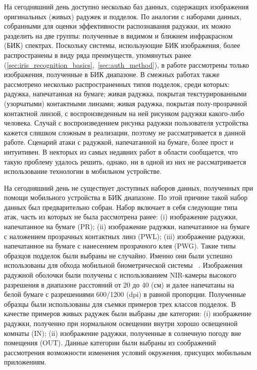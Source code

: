На сегодняшний день доступно несколько баз данных, содержащих изображения оригинальных (живых) радужек и подделок.
По аналогии с наборами данных, собранными для оценки эффективности распознавания радужки, их можно разделить на две группы: полученные в видимом и ближнем инфракрасном (БИК) спектрах. Поскольку системы, использующие БИК изображения, более распространены в виду ряда преимуществ, упомянутых ранее (\ref{sec:iris_recognition_basics},~\ref{sec:auth_method}), в работе рассмотрены только изображения, полученные в БИК диапазоне. В смежных работах также рассмотрено несколько распространенных типов подделок, среди которых: радужка, напечатанная на бумаге; живая радужка, покрытая текстурированными (узорчатыми) контактными линзами; живая радужка, покрытая полу-прозрачной контактной линзой, с воспроизведенным на ней рисунком радужки какого-либо человека. Случай с воспроизведением рисунка радужки пользователя устройства кажется слишком сложным в реализации, поэтому не рассматривается в данной работе. Сценарий атаки с радужкой, напечатанной на бумаге, более прост и интуитивен. В некторых из самых недавних работ в области сообщается, что такую проблему удалось решить, однако, ни в одной из них не рассматривается использование технологии в мобильном устройстве.

На сегодняшний день не существует доступных наборов данных, полученных при помощи мобильного устройства в БИК диапазоне. По этой причине такой набор данных был предварительно собран. Набор включает в себя следующие типа атак, часть из которых не была рассмотрена ранее: (i) изображение радужки, напечатанное на бумаге (PR); (ii) изображение радужки, напечатанное на бумаге с наложением прозрачных контактных линз (PWL); (iii) изображение радужки, напечатанное на бумаге с нанесением прозрачного клея (PWG). Такие типы образцов подделок были выбраны не случайно. Именно они были успешно использованы для обхода мобильной биометрической системы ~\cite{ccc,bkav}. Изображения радужной оболочки были получены с использованием NIR-камеры высокого разрешения в диапазоне расстояний от 20 до 40 (см) и далее напечатаны на белой бумаге с разрешениями 600/1200 (dpi) в равной пропорции. Полученные образцы были использованы для съемки примеров трех классов подделок. В качестве примеров живых радужек были выбраны две категории: (i) изображение радужки, полученно при нормальном освещении внутри хорошо освещенной комнаты (IN); (ii) изображение радужки, полученные в солнечную погоду вне помещения (OUT). Данные категории были выбраны из соображений рассмотрения возможности изменения условий окружения, присущих мобильным приложениям.

